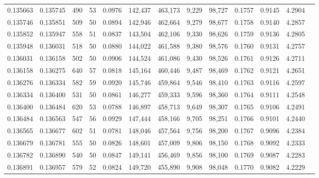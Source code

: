 \begin{tabular}{rrrrrrrrrrrrr}
0.135663 & 0.135745 &   490 &  53 &                                     0.0976 & 142,437 & 463,173 &   9,229 &  98,727 & 0.1757 & 0.9145 & 4.2904 \\
0.135746 & 0.135851 &   509 &  50 &                                     0.0894 & 142,946 & 462,664 &   9,279 &  98,677 & 0.1758 & 0.9140 & 4.2857 \\
0.135852 & 0.135947 &   558 &  51 &                                     0.0837 & 143,504 & 462,106 &   9,330 &  98,626 & 0.1759 & 0.9136 & 4.2805 \\
0.135948 & 0.136031 &   518 &  50 &                                     0.0880 & 144,022 & 461,588 &   9,380 &  98,576 & 0.1760 & 0.9131 & 4.2757 \\
0.136031 & 0.136158 &   502 &  50 &                                     0.0906 & 144,524 & 461,086 &   9,430 &  98,526 & 0.1761 & 0.9126 & 4.2711 \\
0.136158 & 0.136275 &   640 &  57 &                                     0.0818 & 145,164 & 460,446 &   9,487 &  98,469 & 0.1762 & 0.9121 & 4.2651 \\
0.136276 & 0.136334 &   582 &  59 &                                     0.0920 & 145,746 & 459,864 &   9,546 &  98,410 & 0.1763 & 0.9116 & 4.2597 \\
0.136334 & 0.136400 &   531 &  50 &                                     0.0861 & 146,277 & 459,333 &   9,596 &  98,360 & 0.1764 & 0.9111 & 4.2548 \\
0.136400 & 0.136484 &   620 &  53 &                                     0.0788 & 146,897 & 458,713 &   9,649 &  98,307 & 0.1765 & 0.9106 & 4.2491 \\
0.136484 & 0.136563 &   547 &  56 &                                     0.0929 & 147,444 & 458,166 &   9,705 &  98,251 & 0.1766 & 0.9101 & 4.2440 \\
0.136565 & 0.136677 &   602 &  51 &                                     0.0781 & 148,046 & 457,564 &   9,756 &  98,200 & 0.1767 & 0.9096 & 4.2384 \\
0.136679 & 0.136781 &   555 &  50 &                                     0.0826 & 148,601 & 457,009 &   9,806 &  98,150 & 0.1768 & 0.9092 & 4.2333 \\
0.136782 & 0.136890 &   540 &  50 &                                     0.0847 & 149,141 & 456,469 &   9,856 &  98,100 & 0.1769 & 0.9087 & 4.2283 \\
0.136891 & 0.136957 &   579 &  52 &                                     0.0824 & 149,720 & 455,890 &   9,908 &  98,048 & 0.1770 & 0.9082 & 4.2229 \\

\end{tabular}
